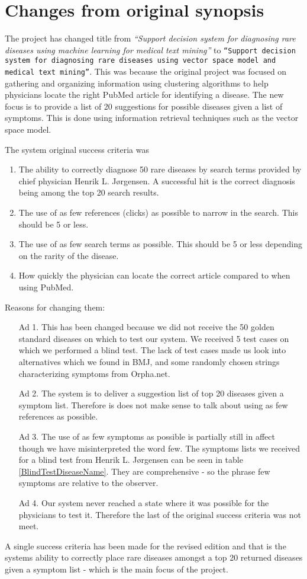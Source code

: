 \chapter*{Changes from original synopsis}

The project has changed title from \textit{``Support decision system
  for diagnosing rare diseases using machine learning for medical text
  mining''} to \texttt{``Support decision system for diagnosing rare
  diseases using vector space model and \\ medical text
  mining''}. This was because the original project was focused on
gathering and organizing information using clustering algorithms to
help physicians locate the right PubMed article for identifying a
disease. The new focus is to provide a list of 20 suggestions for
possible diseases given a list of symptoms. This is done using
information retrieval techniques such as the vector space model.

The system original success criteria was
\begin{enumerate}
\item The ability to correctly diagnose 50 rare diseases by search
  terms provided by chief physician Henrik L. J\o rgensen. A
  successful hit is the correct diagnosis being among the top 20
  search results.
\item The use of as few references (clicks) as possible to narrow in
  the search.  This should be 5 or less.
\item The use of as few search terms as possible. This should be 5 or
  less depending on the rarity of the disease.
\item How quickly the physician can locate the correct article
  compared to when using PubMed.
\end{enumerate}

Reasons for changing them:
\begin{itemize}
\item[Ad 1.] This has been changed because we did not receive the 50 golden
standard diseases on which to test our system. We received 5 test
cases on which we performed a blind test. The lack of test cases made
us look into alternatives which we found in BMJ, and some randomly
chosen strings characterizing symptoms from Orpha.net.

\item[Ad 2.] The system is to deliver a suggestion list of top 20 diseases given a
symptom list. Therefore is does not make sense to talk about using as
few references as possible.

\item[Ad 3.] The use of as few symptoms as possible is partially still in affect
though we have misinterpreted the word few. The symptoms lists we
received for a blind test from Henrik L. J\o rgensen can be seen in
table \ref{BlindTestDiseaseName}. They are comprehensive - so the
phrase few symptoms are relative to the observer.

\item[Ad 4.] Our system never reached a state where it was possible for the
physicians to test it. Therefore the last of the original success
criteria was not meet.
\end{itemize}

A single success criteria has been made for the revised
edition and that is the systems ability to correctly place rare
diseases amongst a top 20 returned diseases given a symptom list - 
which is the main focus of the project.
